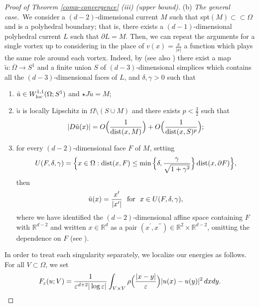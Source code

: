 \documentclass[11pt]{article}
\def\e{\varepsilon}
\def\dxy{\,dx dy}
\begin{document}
\begin{proof}[Proof of Theorem {\rm\ref{comp-convergence}} {\rm (iii)} (upper bound)]
\bigskip 

\noindent(b) {\em The general case.}\ 
We consider a $(d-2)$-dimensional current $M$ such that spt$(M)\subset\subset\Omega$ and is a polyhedral boundary; that is, there exists a $(d-1)$-dimensional polyhedral current $L$ such that $\partial L=M$. Then, we can repeat the arguments for a single vortex up to considering in the place of $v(x)=\frac{x}{|x|}$ a function which plays the same role around each vortex. 
Indeed, 
by \cite[Theorem 9.6]{ABS} (see also \cite[Proof of Theorem 3]{AC}) there exist a map $\tilde u\colon\overline{\Omega}\to S^{1}$ and a finite union $S$ of $(d-3)$-dimensional simplices which contains all the $(d-3)$-dimensional faces of $L$, and $\delta,\gamma>0$ such that 
\begin{enumerate}
\item[(i)] $\tilde u\in W^{1,1}_{\rm loc}(\Omega;S^1)$ and $\star J\tilde u=M$; 
\item[(ii)] $\tilde u$ is locally Lipschitz in $\Omega\setminus(S\cup M)$ and there exists $p<\frac{3}{2}$ such that 
\begin{equation}\label{tildeu1} 
|D\tilde u(x)|=O\Big(\frac{1}{{\rm dist}(x, M)}\Big)+O\Big(\frac{1}{{\rm dist}(x, S)^p}\Big); 
\end{equation}
\item[(iii)] for every $(d-2)$-dimensional face $F$ of $M$, setting 
$$U(F,\delta,\gamma)=\Big\{x\in \Omega: {\rm dist}(x,F)\leq \min\Big\{\delta,\frac{\gamma}{\sqrt{1+\gamma^2}}\Big\}\, {\rm dist}(x,\partial F)\Big\},$$
then 
\begin{equation}\label{tildeu2}  
\tilde u(x)=\frac{x^\prime}{|x^\prime|} \ \ \hbox{\rm for }\ x\in U(F,\delta,\gamma), 
\end{equation} 
where we have identified the $(d-2)$-dimensional affine space containing $F$ with $\mathbb R^{d-2}$ and written $x\in \mathbb R^d$ as a pair $(x^\prime,x^{\prime\prime})\in \mathbb R^2\times \mathbb R^{d-2}$, omitting the dependence on $F$ (see \cite[Section 4.1]{ABS}). 
\end{enumerate}
In order to treat each singularity separately, we localize our energies as follows. 
For all $V\subset\Omega$, we set 
$$F_\e(u;V)={1\over\e^{d+2}|\log\e|} \int_{V\times V}\rho\Bigl({|x-y|\over\e}\Bigr) {|u(x)-u(y)|^2}\dxy.$$



\end{proof}
\end{document}
